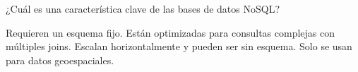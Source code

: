 \question[1] ¿Cuál es una característica clave de las bases de datos NoSQL?
\begin{choices}
\choice Requieren un esquema fijo.
\choice Están optimizadas para consultas complejas con múltiples joins.
\CorrectChoice Escalan horizontalmente y pueden ser sin esquema.
\choice Solo se usan para datos geoespaciales.
\end{choices}